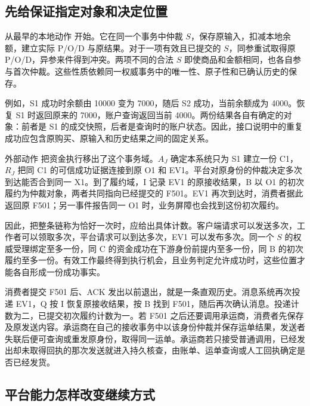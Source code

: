 \subsection*{先给保证指定对象和决定位置}

从最早的本地动作  开始。它在同一个事务中仲裁 $S$，保存原输入，扣减本地余额，建立实际 P/O/D 与原结果。对于一项有效且已提交的 $S$，同参重试取得原 P/O/D，异参来件得到冲突。两项不同的合法 $S$ 即使商品和金额相同，也各自参与首次仲裁。这些性质依赖同一权威事务中的唯一性、原子性和已确认历史的保存。

例如，S1 成功时余额由 10000 变为 7000，随后 S2 成功，当前余额成为 4000。恢复 S1 时返回原来的 7000，账户查询返回当前 4000。两份结果各自有确定的对象：前者是 S1 的成交快照，后者是查询时的账户状态。因此，接口说明中的重复成功应包含原购买、原输入和历史结果之间的固定关系。

外部动作  把资金执行移出了这个事务域。$A_J$ 确定本系统只为 S1 建立一份 C1，$R_J$ 把同 C1 的可信成功证据连接到原 O1 和 EV1。平台对原身份的仲裁决定多次到达能否合到同一 X1。到了履约域，I 记录 EV1 的原接收结果，B 以 O1 的初次履约为仲裁对象，两者共同指向已经提交的 F501。EV1 再次到达时，消费者据此返回原 F501；另一事件报告同一 O1 时，业务屏障也会找到这份初次履约。


因此，把整条链称为恰好一次时，应给出具体计数。客户端请求可以发送多次，工作者可以领取多次，平台请求可以到达多次，EV1 可以发布多次。同一个 $S$ 的权威受理绑定至多一份，同 C 的资金成功在下游身份前提内至多一份，同 B 的初次履约至多一份。有效工作最终得到执行机会，且业务判定允许成功时，这些位置才能各自形成一份成功事实。

消费者提交 F501 后、ACK 发出以前退出，就是一条直观历史。消息系统再次投递 EV1，Q 按 I 恢复原接收结果，按 B 找到 F501，随后再次确认消息。投递计数为二，已提交初次履约计数为一。若 F501 之后还要调用承运商，消费者先保存  及原发送内容。承运商在自己的接收事务中以该身份仲裁并保存运单结果，发送者失联后便可查询或重发原身份，取得同一运单。承运商若只接受普通调用，已经发出却未取得回执的那次发送就进入持久核查，由账单、运单查询或人工回执确定是否已经发货。


\subsection*{平台能力怎样改变继续方式}

